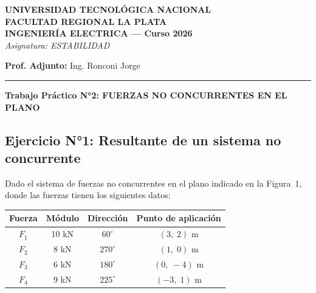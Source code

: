 \documentclass[11pt,a4paper]{article}
\begin{document}
\begin{center}
    \textbf{UNIVERSIDAD TECNOLÓGICA NACIONAL \\ FACULTAD REGIONAL LA PLATA} \\
    \vspace{0.2cm}
    \textbf{INGENIERÍA ELECTRICA — Curso 2026} \\
    \vspace{0.2cm}
    \textit{Asignatura: ESTABILIDAD}
\end{center}

\vspace{0.3cm}

\begin{flushleft}
    \textbf{Prof. Adjunto:} Ing. Ronconi Jorge \\
\end{flushleft}

\noindent\rule{\linewidth}{0.4pt}

\begin{center}
    \vspace{0.4cm}
    \Large \textbf{Trabajo Práctico N°2: FUERZAS NO CONCURRENTES EN EL PLANO} \\
    \vspace{0.4cm}
\end{center}

\subsection*{Ejercicio N°1: Resultante de un sistema no concurrente}

Dado el sistema de fuerzas no concurrentes en el plano indicado en la Figura~1,
donde las fuerzas tienen los siguientes datos:

\begin{center}
\begin{tabular}{cccc}
\hline
\textbf{Fuerza} & \textbf{Módulo} & \textbf{Dirección} & \textbf{Punto de aplicación} \\
\hline
$F_1$ & 10 kN & $60^\circ$  & $( 3,\; 2)$ m \\
$F_2$ & 8 kN  & $270^\circ$ & $( 1,\; 0)$ m \\
$F_3$ & 6 kN  & $180^\circ$ & $( 0,\;-4)$ m \\
$F_4$ & 9 kN  & $225^\circ$ & $(-3,\; 1)$ m \\
\hline
\end{tabular}
\end{center}
\end{document}
